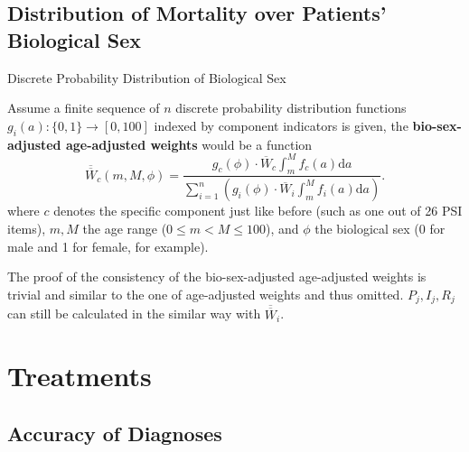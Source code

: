 \documentclass[8pt, hyperref={colorlinks=true}]{beamer}
\begin{document}
\subsection{Distribution of Mortality over Patients' Biological Sex}

\begin{frame}{Discrete Probability Distribution of Biological Sex}
\begin{definition}
Assume a finite sequence of $n$ discrete probability distribution functions $g_i(a): \{0,1\}\to[0,100]$ indexed by component indicators is given, the \textbf{bio-sex-adjusted age-adjusted weights} would be a function
\[
\overline{\overline{W}}_c\left(m, M, \phi\right) = \frac{\displaystyle g_c \left(\phi\right) \cdot \overline{W}_c\int_m^M \! f_c\left(a\right)\mathrm{d}a}{\displaystyle\sum_{i=1}^{n}\left(g_i\left(\phi\right) \cdot \overline{W}_i \int_m^M \! f_i\left(a\right) \mathrm{d}a \right)}.
\]
where $c$ denotes the specific component just like before (such as one out of 26 PSI items), $m, M$ the age range ($0\leq m<M\leq 100$), and $\phi$ the biological sex (0 for male and 1 for female, for example).
\end{definition}

The proof of the consistency of the bio-sex-adjusted age-adjusted weights is trivial and similar to the one of age-adjusted weights and thus omitted. $P_j, I_j, R_j$ can still be calculated in the similar way with $\overline{\overline{W}}_i$.
\end{frame}

\section{Treatments}

\subsection{Accuracy of Diagnoses}

\end{document}
